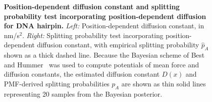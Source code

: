 \documentclass[aps,prl,twocolumn,superscriptaddress,floatfix]{revtex4-1}
\begin{document}
\begin{figure}[tbp]
\caption{{\bf Position-dependent diffusion constant and splitting probability test incorporating position-dependent diffusion for DNA hairpin.}
\emph{Left:} Position-dependent diffusion constant, in nm/s$^2$.
\emph{Right:} Splitting probability test incorporating position-dependent diffusion constant, with empirical splitting probability $\hat{p}_A$ shown as a thick dashed line.
Because the Bayesian scheme of Best and Hummer~\cite{best-hummer:2010:pnas:coordinate-dependent-diffusion} was used to compute potentials of mean force and diffusion constants, the estimated diffusion constant $D(x)$ and PMF-derived splitting probabilities $p_A$ are shown as thin solid lines representing 20 samples from the Bayesian posterior.
}
\label{figure:coordinate-dependent-diffusion-hairpin}
\end{figure}
\end{document}
